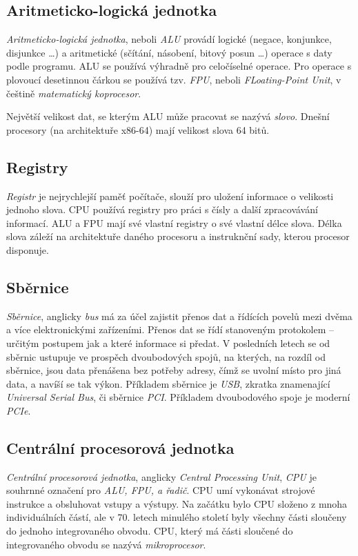 \documentclass[a4paper]{article}
\begin{document}
    \subsection{Aritmeticko-logická jednotka}
        \textit{Aritmeticko-logická jednotka}, neboli \textit{ALU} provádí logické (negace, konjunkce, disjunkce \dots) a aritmetické (sčítání, násobení, bitový posun \dots) operace s daty podle programu. ALU se používá výhradně pro celočíselné operace. Pro operace s plovoucí desetinnou čárkou se používá tzv. \textit{FPU}, neboli \textit{FLoating-Point Unit}, v češtině \textit{matematický koprocesor}. \par
        Největší velikost dat, se kterým ALU může pracovat se nazývá \textit{slovo}. Dnešní procesory (na architektuře x86-64) mají velikost slova 64 bitů.
    \subsection{Registry}
        \textit{Registr} je nejrychlejší paměť počítače, slouží pro uložení informace o velikosti jednoho slova. CPU používá registry pro práci s čísly a další zpracovávání informací. ALU a FPU mají své vlastní registry o své vlastní délce slova. Délka slova záleží na architektuře daného procesoru a instruknční sady, kterou procesor disponuje.
    \subsection{Sběrnice}
        \textit{Sběrnice}, anglicky \textit{bus} má za účel zajistit přenos dat a řídících povelů mezi dvěma a více elektronickými zařízeními. Přenos dat se řídí stanoveným protokolem -- určitým postupem jak a které informace si předat. V posledních letech se od sběrnic ustupuje ve prospěch dvoubodových spojů, na kterých, na rozdíl od sběrnice, jsou data přenášena bez potřeby adresy, čímž se uvolní místo pro jiná data, a navíší se tak výkon. Příkladem sběrnice je \textit{USB}, zkratka znamenající \textit{Universal Serial Bus}, či sběrnice \textit{PCI}. Příkladem dvoubodového spoje je moderní \textit{PCIe}.
    \subsection{Centrální procesorová jednotka}
        \textit{Centrální procesorová jednotka}, anglicky \textit{Central Processing Unit}, \textit{CPU} je souhrnné označení pro \textit{ALU, FPU, a řadič}. CPU umí vykonávat strojové instrukce a obsluhovat vstupy a výstupy. Na začátku bylo CPU složeno z mnoha individuálních částí, ale v 70. letech minulého století byly všechny části sloučeny do jednoho integrovaného obvodu. CPU, který má části sloučené do integrovaného obvodu se nazývá \textit{mikroprocesor}.
\end{document}
